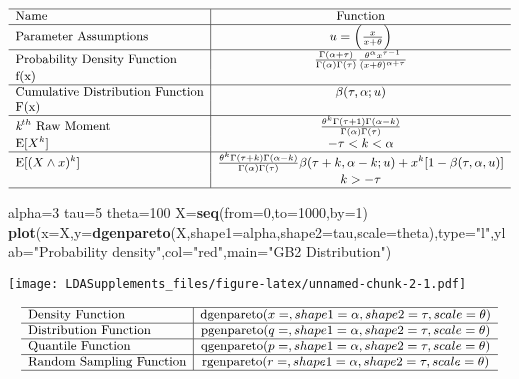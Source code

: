 \documentclass[]{book}
\newenvironment{Shaded}{\begin{snugshade}}{\end{snugshade}}
\newcommand{\KeywordTok}[1]{\textcolor[rgb]{0.13,0.29,0.53}{\textbf{#1}}}
\newcommand{\DataTypeTok}[1]{\textcolor[rgb]{0.13,0.29,0.53}{#1}}
\newcommand{\DecValTok}[1]{\textcolor[rgb]{0.00,0.00,0.81}{#1}}
\newcommand{\StringTok}[1]{\textcolor[rgb]{0.31,0.60,0.02}{#1}}
\newcommand{\NormalTok}[1]{#1}
\begin{document}
\[
{\small
\begin{matrix}
\begin{array}{l|c}
\hline
  \text{Name} & \text{Function} \\
\hline
  \text{Parameter Assumptions} & u=\Big(\frac{x}{x+\theta}\Big) \\
\hline
  \text{Probability Density Function} & \frac{\Gamma(\alpha+\tau)}{\Gamma(\alpha)\Gamma(\tau)}\frac{\theta^\alpha x^{\tau-1}}{(x+\theta)^{\alpha+\tau}} \\
    \text{f(x)} & \\
\hline
  \text{Cumulative Distribution Function} & \beta(\tau,\alpha;u) \\
    \text{F(x)} & \\
\hline
  \textit{k}^{th}~\text{Raw Moment} & \frac{\theta^k\Gamma(\tau+1)\Gamma(\alpha-k)}{\Gamma(\alpha)\Gamma(\tau)} \\
  \mathrm{E}[X^k]  & -\tau<k<\alpha \\
\hline
  \mathrm{E}[(X\wedge x)^k] & \frac{\theta^k\Gamma(\tau+k)\Gamma(\alpha-k)}{\Gamma(\alpha)\Gamma(\tau)}\beta(\tau+k,\alpha-k;u)+x^k[1-\beta(\tau,\alpha,u)]  \\
  & k>-\tau \\
\hline
\end{array}
\end{matrix}
}
\]

\begin{Shaded}
\begin{Highlighting}[]
\NormalTok{alpha=}\DecValTok{3}
\NormalTok{tau=}\DecValTok{5}
\NormalTok{theta=}\DecValTok{100}
\NormalTok{X=}\KeywordTok{seq}\NormalTok{(}\DataTypeTok{from=}\DecValTok{0}\NormalTok{,}\DataTypeTok{to=}\DecValTok{1000}\NormalTok{,}\DataTypeTok{by=}\DecValTok{1}\NormalTok{)}
\KeywordTok{plot}\NormalTok{(}\DataTypeTok{x=}\NormalTok{X,}\DataTypeTok{y=}\KeywordTok{dgenpareto}\NormalTok{(X,}\DataTypeTok{shape1=}\NormalTok{alpha,}\DataTypeTok{shape2=}\NormalTok{tau,}\DataTypeTok{scale=}\NormalTok{theta),}\DataTypeTok{type=}\StringTok{"l"}\NormalTok{,}\DataTypeTok{ylab=}\StringTok{"Probability density"}\NormalTok{,}\DataTypeTok{col=}\StringTok{"red"}\NormalTok{,}\DataTypeTok{main=}\StringTok{"GB2 Distribution"}\NormalTok{)}
\end{Highlighting}
\end{Shaded}

\texttt{[image: LDASupplements\_files/figure-latex/unnamed-chunk-2-1.pdf]}

\[
{\small
\begin{matrix}
\begin{array}{l|c}
\hline
  \text{Density Function} & \text{dgenpareto}(x=, shape1=\alpha, shape2=\tau, scale=\theta) \\
\hline
  \text{Distribution Function} & \text{pgenpareto}(q=, shape1=\alpha, shape2=\tau, scale=\theta) \\
\hline
  \text{Quantile Function} & \text{qgenpareto}(p=, shape1=\alpha, shape2=\tau, scale=\theta) \\ 
\hline
  \text{Random Sampling Function} & \text{rgenpareto}(r=, shape1=\alpha, shape2=\tau, scale=\theta) \\
\hline
\end{array}
\end{matrix}
}
\]
\end{document}
